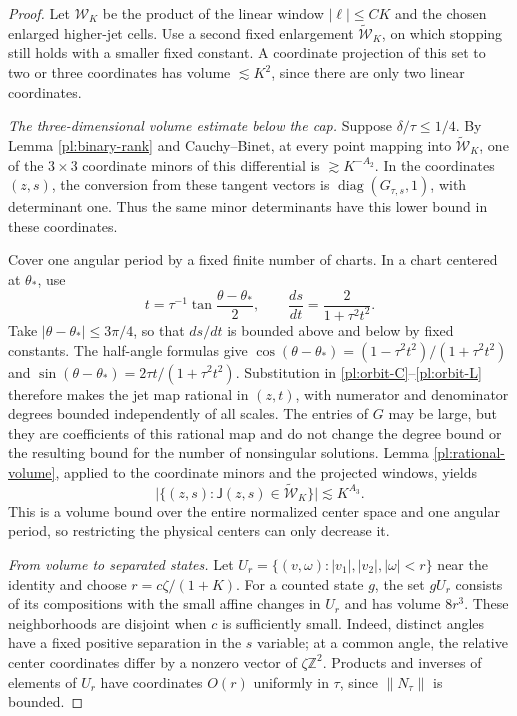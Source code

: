 \documentclass[11pt]{amsart}
\theoremstyle{definition}
\theoremstyle{remark}
\numberwithin{equation}{section}
\begin{document}
\begin{proof}
Let $\mathcal W_K$ be the product of the linear window $|\ell|\le CK$ and the chosen enlarged higher-jet cells. Use a second fixed enlargement $\widetilde{\mathcal W}_K$, on which stopping still holds with a smaller fixed constant. A coordinate projection of this set to two or three coordinates has volume $\lesssim K^2$, since there are only two linear coordinates.

\emph{The three-dimensional volume estimate below the cap.} Suppose $\delta/\tau\le1/4$. By Lemma \ref{pl:binary-rank} and Cauchy--Binet, at every point mapping into $\widetilde{\mathcal W}_K$, one of the $3\times3$ coordinate minors of this differential is $\gtrsim K^{-A_2}$. In the coordinates $(z,s)$, the conversion from these tangent vectors is $\operatorname{diag}(G_{\tau,s},1)$, with determinant one. Thus the same minor determinants have this lower bound in these coordinates.

Cover one angular period by a fixed finite number of charts. In a chart centered at $\theta_*$, use
\begin{equation}\label{pl:rational-angle}
t=\tau^{-1}\tan\frac{\theta-\theta_*}{2},
\qquad \frac{ds}{dt}=\frac{2}{1+\tau^2t^2}.
\end{equation}
Take $|\theta-\theta_*|\le3\pi/4$, so that $ds/dt$ is bounded above and below by fixed constants. The half-angle formulas give $\cos(\theta-\theta_*)=(1-\tau^2t^2)/(1+\tau^2t^2)$ and $\sin(\theta-\theta_*)=2\tau t/(1+\tau^2t^2)$. Substitution in \eqref{pl:orbit-C}--\eqref{pl:orbit-L} therefore makes the jet map rational in $(z,t)$, with numerator and denominator degrees bounded independently of all scales. The entries of $G$ may be large, but they are coefficients of this rational map and do not change the degree bound or the resulting bound for the number of nonsingular solutions. Lemma \ref{pl:rational-volume}, applied to the coordinate minors and the projected windows, yields
\begin{equation}\label{pl:full-orbit-volume}
\bigl|\{(z,s):\mathsf J(z,s)\in\widetilde{\mathcal W}_K\}\bigr|
\lesssim K^{A_3}.
\end{equation}
This is a volume bound over the entire normalized center space and one angular period, so restricting the physical centers can only decrease it.

\emph{From volume to separated states.} Let $U_r=\{(v,\omega):|v_1|,|v_2|,|\omega|<r\}$ near the identity and choose $r=c\zeta/(1+K)$. For a counted state $g$, the set $gU_r$ consists of its compositions with the small affine changes in $U_r$ and has volume $8r^3$. These neighborhoods are disjoint when $c$ is sufficiently small. Indeed, distinct angles have a fixed positive separation in the $s$ variable; at a common angle, the relative center coordinates differ by a nonzero vector of $\zeta\mathbb Z^2$. Products and inverses of elements of $U_r$ have coordinates $O(r)$ uniformly in $\tau$, since $\|N_\tau\|$ is bounded.


\end{proof}
\end{document}
